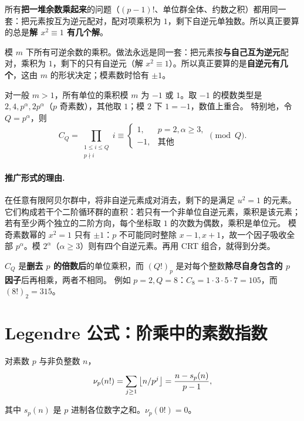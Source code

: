 \begin{tip}[一节里其实在算什么乘积]
所有\textbf{把一堆余数乘起来}的问题（$(p-1)!$、单位群全体、约数之积）都用同一套：把元素按互为逆元配对，配对项乘积为 $1$，剩下自逆元单独数。所以真正要算的总是\textbf{解 $x^2\equiv1$ 有几个解}。
\end{tip}


\begin{tip}
模 $m$ 下所有可逆余数的乘积。做法永远是同一套：把元素按\textbf{与自己互为逆元}配对，乘积为 $1$，剩下的只有自逆元（解 $x^2\equiv1$）。所以真正要算的是\textbf{自逆元有几个}，这由 $m$ 的形状决定；模素数时恰有 $\pm1$。
\end{tip}

对一般 $m>1$，所有单位的乘积模 $m$ 为 $-1$ 或 $1$。取 $-1$ 的模数类型是 $2,4,p^\alpha,2p^\alpha$（$p$ 奇素数），其他取 $1$；模 $2$ 下 $1=-1$，数值上重合。
特别地，令 $Q=p^\alpha$，则
\[
 C_Q=\prod_{\substack{1\le i\le Q\\p\nmid i}}i\equiv
 \begin{cases}1,&p=2,\alpha\ge3,\\-1,&\text{其他}\end{cases}\pmod Q.
\]


\paragraph{推广形式的理由.}
在任意有限阿贝尔群中，将非自逆元素成对消去，剩下的是满足 $u^2=1$ 的元素。它们构成若干个二阶循环群的直积：若只有一个非单位自逆元素，乘积是该元素；若有至少两个独立的二阶方向，每个坐标取 $1$ 的次数为偶数，乘积是单位元。
模奇素数幂的 $x^2=1$ 只有 $\pm1$：$p$ 不可能同时整除 $x-1,x+1$，故一个因子吸收全部 $p^\alpha$。模 $2^\alpha$（$\alpha\ge3$）则有四个自逆元素。再用 CRT 组合，就得到分类。
\begin{pitfall}
$C_Q$ 是\textbf{删去 $p$ 的倍数后}的单位乘积，而 $(Q!)_p$ 是对每个整数\textbf{除尽自身包含的 $p$ 因子}后再相乘，两者不相同。
例如 $p=2,Q=8$：$C_8=1\cdot3\cdot5\cdot7=105$，而 $(8!)_2=315$。
\end{pitfall}


\section{Legendre 公式：阶乘中的素数指数}
\begin{theorem}
对素数 $p$ 与非负整数 $n$，
\[
 \nu_p(n!)=\sum_{j\ge1}\left\lfloor n/p^j\right\rfloor
 =\frac{n-s_p(n)}{p-1},
\]


其中 $s_p(n)$ 是 $p$ 进制各位数字之和。$\nu_p(0!)=0$。
\end{theorem}

